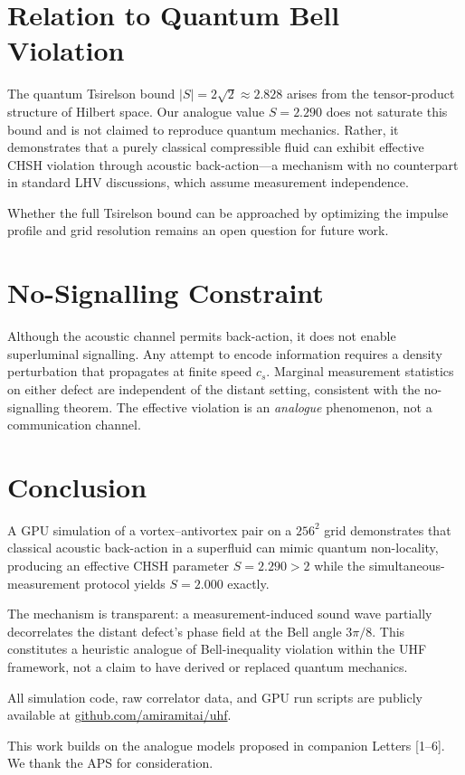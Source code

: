 \documentclass[reprint,amsmath,amssymb,aps,prl,superscriptaddress]{revtex4-2}
\begin{document}
\section{Relation to Quantum Bell Violation}
\label{sec:discussion}

The quantum Tsirelson bound $|S|=2\sqrt{2}\approx 2.828$ arises from
the tensor-product structure of Hilbert space.  Our analogue value
$S=2.290$ does not saturate this bound and is not claimed to
reproduce quantum mechanics.  Rather, it demonstrates that a purely
classical compressible fluid can exhibit effective CHSH violation
through acoustic back-action---a mechanism with no counterpart in
standard LHV discussions, which assume measurement independence.

Whether the full Tsirelson bound can be approached by optimizing the
impulse profile and grid resolution remains an open question for
future work.

\section{No-Signalling Constraint}
\label{sec:nosignaling}

Although the acoustic channel permits back-action, it does not enable
superluminal signalling.  Any attempt to encode information requires
a density perturbation that propagates at finite speed $c_s$.
Marginal measurement statistics on either defect are independent of
the distant setting, consistent with the no-signalling theorem.
The effective violation is an \emph{analogue} phenomenon, not a
communication channel.

\section{Conclusion}
\label{sec:conclusion}

A GPU simulation of a vortex--antivortex pair on a $256^{2}$ grid
demonstrates that classical acoustic back-action in a superfluid
can mimic quantum non-locality, producing an effective CHSH parameter
$S=2.290>2$ while the simultaneous-measurement protocol yields
$S=2.000$ exactly.

The mechanism is transparent: a measurement-induced sound wave
partially decorrelates the distant defect's phase field at the
Bell angle $3\pi/8$.  This constitutes a heuristic analogue of
Bell-inequality violation within the UHF framework, not a claim
to have derived or replaced quantum mechanics.

All simulation code, raw correlator data, and GPU run scripts are
publicly available at
\href{https://github.com/amiramitai/uhf}{github.com/amiramitai/uhf}.

\begin{acknowledgments}
This work builds on the analogue models proposed in companion Letters [1--6]. We thank the APS for consideration.
\end{acknowledgments}



\end{document}
